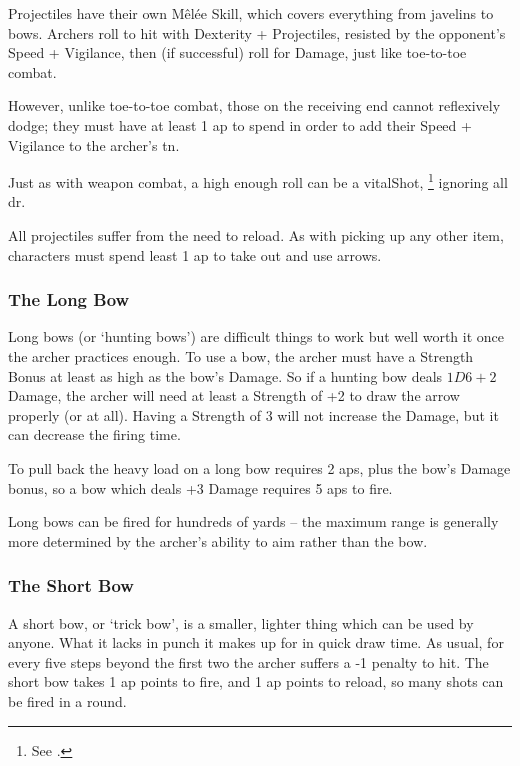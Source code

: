 \begin{multicols}{2}

\noindent
Projectiles have their own M\^el\'ee Skill, which covers everything from javelins to bows.
Archers roll to hit with Dexterity + Projectiles, resisted by the opponent's Speed + Vigilance, then (if successful) roll for Damage, just like toe-to-toe combat.



However, unlike toe-to-toe combat, those on the receiving end cannot reflexively dodge; they must have at least 1 \gls{ap} to spend in order to add their Speed + Vigilance to the archer's \gls{tn}.

Just as with weapon combat, a high enough roll can be a \gls{vitalShot},%
\footnote{See .}
ignoring all \gls{dr}.

All projectiles suffer from the need to reload.
As with picking up any other item, characters must spend least 1 \gls{ap} to take out and use arrows.

\subsubsection{The Long Bow}
\label{longbow}

Long bows (or `hunting bows') are difficult things to work but well worth it once the archer practices enough.
To use a bow, the archer must have a Strength Bonus at least as high as the bow's Damage.
So if a hunting bow deals $1D6+2$ Damage, the archer will need at least a Strength of +2 to draw the arrow properly (or at all).
Having a Strength of 3 will not increase the Damage, but it can decrease the firing time.

To pull back the heavy load on a long bow requires 2 \glspl{ap}, plus the bow's Damage bonus, so a bow which deals +3 Damage requires 5 \glspl{ap} to fire.

Long bows can be fired for hundreds of yards -- the maximum range is generally more determined by the archer's ability to aim rather than the bow.

\subsubsection{The Short Bow}

A short bow, or `trick bow', is a smaller, lighter thing which can be used by anyone.
What it lacks in punch it makes up for in quick draw time.
As usual, for every five steps beyond the first two the archer suffers a -1 penalty to hit.
The short bow takes 1 \gls{ap} points to fire, and 1 \gls{ap} points to reload, so many shots can be fired in a \gls{round}.


\end{multicols}
